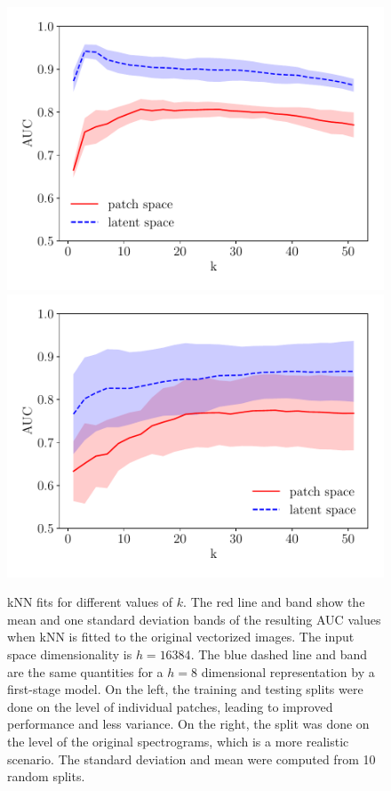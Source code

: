 \begin{figure}
\centering
\includegraphics[scale=0.45]{data/chapter_alfven/split_patches.pdf}
\includegraphics[scale=0.45]{data/chapter_alfven/split_spectrograms.pdf}
\caption{kNN fits for different values of $k$. The red line and band show the mean and one standard deviation bands of the resulting AUC values when kNN is fitted to the original vectorized images. The input space dimensionality is $h=16384$. The blue dashed line and band are the same quantities for a $h=8$ dimensional representation by a first-stage model. On the left, the training and testing splits were done on the level of individual patches, leading to improved performance and less variance. On the right, the split was done on the level of the original spectrograms, which is a more realistic scenario. The standard deviation and mean were computed from 10 random splits.}
\label{fig:patches_latent}
\end{figure}

